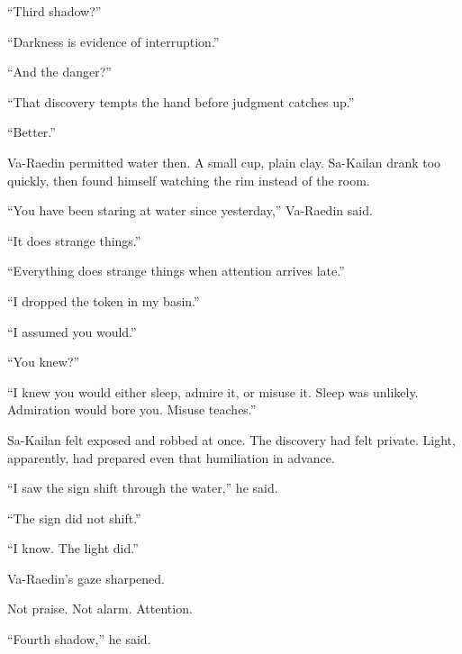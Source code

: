 “Third shadow?”\par

“Darkness is evidence of interruption.”\par

“And the danger?”\par

“That discovery tempts the hand before judgment catches up.”\par

“Better.”\par

Va-Raedin permitted water then.
A small cup, plain clay.
Sa-Kailan drank too quickly, then found himself watching the rim instead of the room.\par

“You have been staring at water since yesterday,” Va-Raedin said.\par

“It does strange things.”\par

“Everything does strange things when attention arrives late.”\par

“I dropped the token in my basin.”\par

“I assumed you would.”\par

“You knew?”\par

“I knew you would either sleep, admire it, or misuse it.
Sleep was unlikely.
Admiration would bore you.
Misuse teaches.”\par

Sa-Kailan felt exposed and robbed at once.
The discovery had felt private.
Light, apparently, had prepared even that humiliation in advance.\par

“I saw the sign shift through the water,” he said.\par

“The sign did not shift.”\par

“I know.
The light did.”\par

Va-Raedin’s gaze sharpened.\par

Not praise.
Not alarm.
Attention.\par

“Fourth shadow,” he said.\par

